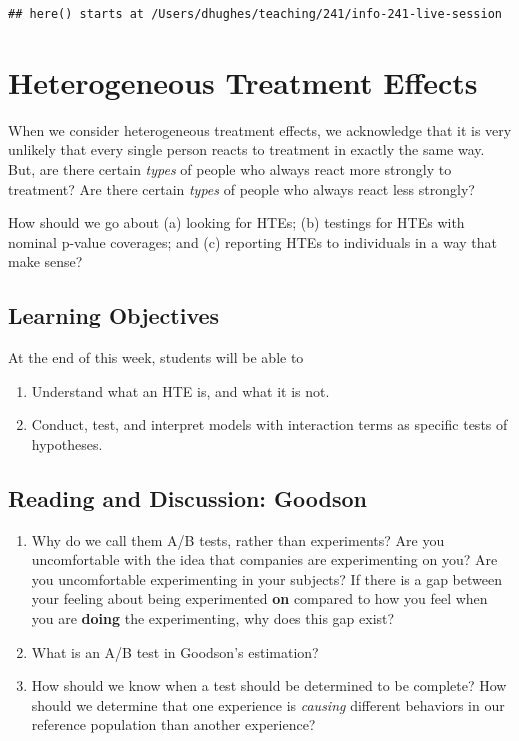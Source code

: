 \documentclass[
]{article}
\providecommand{\tightlist}{%
  \setlength{\itemsep}{0pt}\setlength{\parskip}{0pt}}
\theoremstyle{definition}
\theoremstyle{definition}
\theoremstyle{definition}
\theoremstyle{definition}
\theoremstyle{remark}
\begin{document}
\begin{verbatim}
## here() starts at /Users/dhughes/teaching/241/info-241-live-session
\end{verbatim}

\section{Heterogeneous Treatment Effects}\label{heterogeneous-treatment-effects}

When we consider heterogeneous treatment effects, we acknowledge that it is very unlikely that every single person reacts to treatment in exactly the same way. But, are there certain \emph{types} of people who always react more strongly to treatment? Are there certain \emph{types} of people who always react less strongly?

How should we go about (a) looking for HTEs; (b) testings for HTEs with nominal p-value coverages; and (c) reporting HTEs to individuals in a way that make sense?

\subsection{Learning Objectives}\label{learning-objectives-7}

At the end of this week, students will be able to

\begin{enumerate}
\def\labelenumi{\arabic{enumi}.}
\tightlist
\item
  Understand what an HTE is, and what it is not.
\item
  Conduct, test, and interpret models with interaction terms as specific tests of hypotheses.
\end{enumerate}

\subsection{Reading and Discussion: Goodson}\label{reading-and-discussion-goodson}

\begin{enumerate}
\def\labelenumi{\arabic{enumi}.}
\tightlist
\item
  Why do we call them A/B tests, rather than experiments? Are you uncomfortable with the idea that companies are experimenting on you? Are you uncomfortable experimenting in your subjects? If there is a gap between your feeling about being experimented \textbf{on} compared to how you feel when you are \textbf{doing} the experimenting, why does this gap exist?
\item
  What is an A/B test in Goodson's estimation?
\item
  How should we know when a test should be determined to be complete? How should we determine that one experience is \emph{causing} different behaviors in our reference population than another experience?
\end{enumerate}
\end{document}

